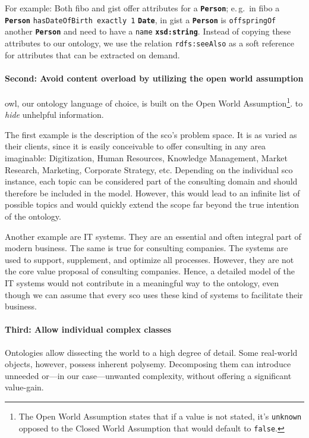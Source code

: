 \documentclass[a4paper, DIV=13, BCOR=0cm]{scrbook}
\newcommand{\eg}{e.\,g.\ }
\newcommand{\class}[1]{\texttt{\textbf{#1}}}
\newcommand{\relation}[1]{\texttt{#1}}
\begin{document}
For example: Both \gls{fibo} and \gls{gist} offer attributes for a \class{Person}; \eg in \gls{fibo} a \class{Person} \relation{hasDateOfBirth exactly 1} \class{Date}, in \gls{gist} a \class{Person} is \relation{offspringOf} another \class{Person} and need to have a \relation{name} \class{xsd:string}. Instead of copying these attributes to our ontology, we use the relation \relation{rdfs:seeAlso} \cite[https://www.w3.org/TR/rdf-schema/\#ch\_seealso]{brickley2014rdf} as a soft reference for attributes that can be extracted on demand.

\paragraph{Second: Avoid content overload by utilizing the open world assumption} \gls{owl}, our ontology language of choice, is built on the Open World Assumption\footnote{The Open World Assumption states that if a value is not stated, it's \texttt{unknown} opposed to the Closed World Assumption that would default to \texttt{false}.}. \cite[p.\,388--389]{moore2015context} \cite[p.\,299, 417]{Russell:2010aa} \cite[p.\,372]{hitzler2009foundations} to \textit{hide} unhelpful information.

The first example is the description of the \gls{sco}'s problem space. It is as varied as their clients, since it is easily conceivable to offer consulting in any area imaginable: Digitization, Human Resources, Knowledge Management, Market Research, Marketing, Corporate Strategy, etc. Depending on the individual \gls{sco} instance, each topic can be considered part of the consulting domain and should therefore be included in the model. However, this would lead to an infinite list of possible topics and would quickly extend the scope far beyond the true intention of the ontology.

Another example are IT systems. They are an essential and often integral part of modern business. The same is true for consulting companies. The systems are used to support, supplement, and optimize all processes. However, they are not the core value proposal of consulting companies. Hence, a detailed model of the IT systems would not contribute in a meaningful way to the ontology, even though we can assume that every \gls{sco} uses these kind of systems to facilitate their business.

\paragraph{Third: Allow individual complex classes} Ontologies allow dissecting the world to a high degree of detail. Some real-world objects, however, possess inherent polysemy. Decomposing them can introduce unneeded or---in our case---unwanted complexity, without offering a significant value-gain.
\end{document}
